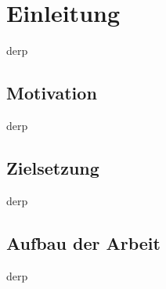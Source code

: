 
\section{Einleitung} \label{sec:einleitung}

derp

\subsection{Motivation} \label{subsec:motivation}

derp

\subsection{Zielsetzung} \label{subsec:zielsetzung}

derp

\subsection{Aufbau der Arbeit} \label{subsec:aufbau}

derp


